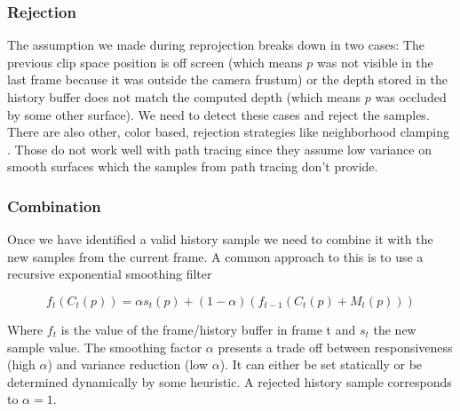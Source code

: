 \documentclass{ACGSeminar}
\begin{document}
\subsubsection{Rejection}
The assumption we made during reprojection breaks down in two cases: The previous clip space position is off screen (which means $p$ was not visible in the last frame because it was outside the camera frustum) or the depth stored in the history buffer does not match the computed depth (which means $p$ was occluded by some other surface). We need to detect these cases and reject the samples. There are also other, color based, rejection strategies like neighborhood clamping \cite{HQTS}. Those do not work well with path tracing since they assume low variance on smooth surfaces which the samples from path tracing don't provide.

\subsubsection{Combination}
Once we have identified a valid history sample we need to combine it with the new samples from the current frame. A common approach to this is to use a recursive exponential smoothing filter \cite{Yang:2009} 

\begin{equation}
f_t(C_{t}(p)) = \alpha s_t(p) + (1-\alpha)(f_{t-1}(C_{t}(p) + M_t(p)))
\end{equation}

Where $f_t$ is the value of the frame/history buffer in frame t and $s_t$ the new sample value. The smoothing factor $\alpha$ presents a trade off between responsiveness (high $\alpha$) and variance reduction (low $\alpha$). It can either be set statically or be determined dynamically by some heuristic. A rejected history sample corresponds to $\alpha = 1$. 
\end{document}
